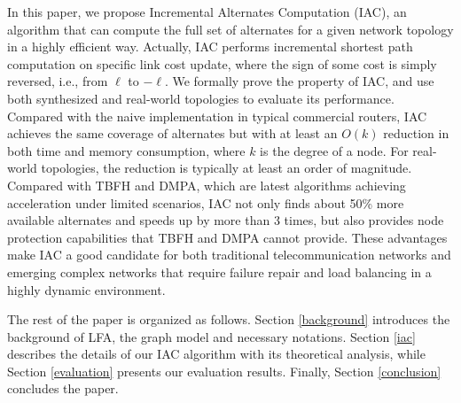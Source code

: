 In this paper, we propose Incremental Alternates Computation (IAC), an algorithm that can
compute the full set of alternates for a given network topology in a highly efficient way.
Actually, IAC performs incremental shortest path computation on specific link 
cost update, 
where the sign of some cost is simply reversed, i.e., from $\ell$ to $-\ell$. 
We formally prove the property of IAC,
and use both synthesized and real-world topologies to evaluate its performance.
Compared with the naive implementation in typical commercial routers, IAC achieves the same coverage of alternates but
with at least an $O(k)$ reduction in both time and memory consumption, where $k$ is the degree of a node. For real-world topologies, the reduction is typically at least an order of magnitude.
Compared with TBFH and DMPA, which are latest algorithms achieving acceleration under limited scenarios,
IAC not only finds about 50\% more available alternates and speeds up by more than 3 times,
but also provides node protection capabilities that TBFH and DMPA cannot provide.
These advantages make IAC a good candidate for both traditional telecommunication networks
and emerging complex networks that require failure repair and load balancing
in a highly dynamic environment.
\iffalse
Our contributions are summarized as follows:
\begin{itemize}
\item We propose an incremental alternates computation (IAC) algorithm based on iSPF, which can compute all the next hops satisfied DC rule. %
\item Theoretical analysis indicates that the computation complexity of IAC is less than that of constructing a shortest path tree and  can provide the same network availability as DC.
\item We propose an IAC algorithm which can  efficiently calculate
the minimum cost of all its neighbors to all other nodes of the
network on the shortest path tree rooted at the compute node. Therefore
IAC can completely and efficiently deal with LFA problem.
\item Theoretical analysis and experiments results indicate that IAC can provide the same network availability as LFA.
\end{itemize}
\fi

The rest of the paper is organized as follows.
Section \ref{background} introduces the background of LFA, the graph model and necessary notations. 
Section \ref{iac} describes the details of our IAC algorithm with its theoretical analysis,  
while Section \ref{evaluation} presents our evaluation results. Finally, Section \ref{conclusion} concludes the paper.
